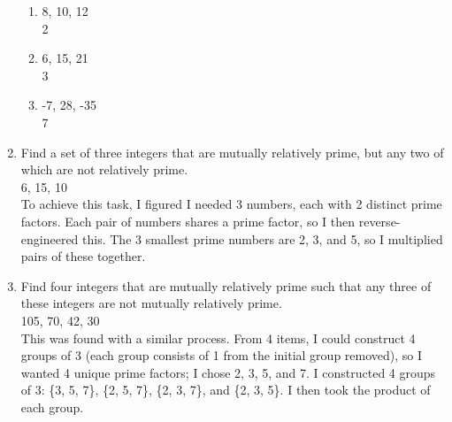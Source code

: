 \documentclass{article}
\begin{document}
\begin{enumerate}
\begin{enumerate}
                  \item 8, 10, 12\\
                        2
                  \item 6, 15, 21\\
                        3
                  \item -7, 28, -35\\
                        7
            \end{enumerate}
      \item Find a set of three integers that are mutually relatively prime, but any two of which are not  relatively prime.\\
            6, 15, 10\\
            To achieve this task, I figured I needed 3 numbers, each with 2 distinct prime factors. Each pair of numbers shares a prime factor, so I then reverse-engineered this. The 3 smallest prime numbers are 2, 3, and 5, so I multiplied pairs of these together.
      \item Find four integers that are mutually relatively prime such that any three of these integers are not mutually relatively prime.\\
      105, 70, 42, 30\\ 
      This was found with a similar process. From 4 items, I could construct 4 groups of 3 (each group consists of 1 from the initial group removed), so I wanted 4 unique prime factors; I chose 2, 3, 5, and 7. I constructed 4 groups of 3: \{3, 5, 7\}, \{2, 5, 7\}, \{2, 3, 7\}, and \{2, 3, 5\}. I then took the product of each group.
\end{enumerate}
\end{document}
